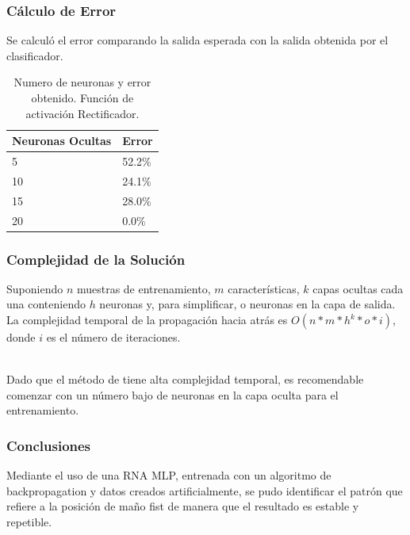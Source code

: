 \documentclass{beamer}
\begin{document}
    \begin{frame}
        \frametitle{Cálculo de Error}

        \hspace*{20pt}Se calculó el error comparando la salida esperada con la salida obtenida por el clasificador.

        \begin{table}[]
            \begin{tabular}{|l|l|}
            \hline
            \textbf{Neuronas Ocultas} & \textbf{Error} \\ \hline
            5                         & 52.2\%         \\ \hline
            10                        & 24.1\%         \\ \hline
            15                        & 28.0\%         \\ \hline
            20                        & 0.0\%          \\ \hline
            \end{tabular}
            \caption{Numero de neuronas y error obtenido. Función de activación Rectificador.}
        \end{table}

    \end{frame}

    \begin{frame}
        \frametitle{Complejidad de la Solución}

        \hspace*{20pt}Suponiendo $n$ muestras de entrenamiento, $m$ características, $k$ capas ocultas cada una conteniendo $h$ 
        neuronas y, para simplificar, o neuronas en la capa de salida. La complejidad temporal de la propagación hacia atrás es 
        $O(n*m*h^k*o*i)$, donde $i$ es el número de iteraciones. \\~\
        
        \hspace*{20pt}Dado que el método de  tiene alta complejidad temporal, es recomendable comenzar con un número 
        bajo de neuronas en la capa oculta para el entrenamiento.

    \end{frame}  

    \begin{frame}
        \frametitle{Conclusiones}

        \hspace*{20pt}Mediante el uso de una RNA MLP, entrenada con un algoritmo de backpropagation y datos creados artificialmente, 
        se pudo identificar el patrón que refiere a la posición de maño fist de manera que el resultado es estable y repetible.
    \end{frame}  
\end{document}
